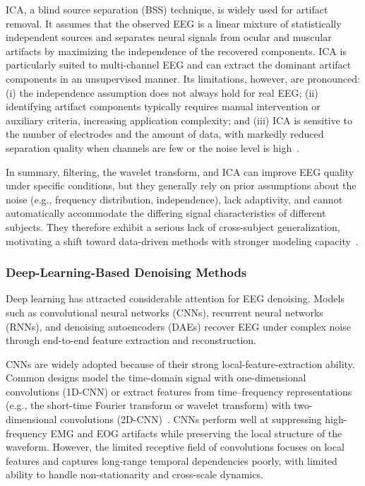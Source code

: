 ICA, a blind source separation (BSS) technique, is widely used for artifact
removal. It assumes that the observed EEG is a linear mixture of statistically
independent sources and separates neural signals from ocular and muscular
artifacts by maximizing the independence of the recovered components. ICA is
particularly suited to multi-channel EEG and can extract the dominant artifact
components in an unsupervised manner. Its limitations, however, are pronounced:
(i) the independence assumption does not always hold for real EEG; (ii)
identifying artifact components typically requires manual intervention or
auxiliary criteria, increasing application complexity; and (iii) ICA is
sensitive to the number of electrodes and the amount of data, with markedly
reduced separation quality when channels are few or the noise level is
high~\cite{jiao2018sparse}.

In summary, filtering, the wavelet transform, and ICA can improve EEG quality
under specific conditions, but they generally rely on prior assumptions about
the noise (e.g., frequency distribution, independence), lack adaptivity, and
cannot automatically accommodate the differing signal characteristics of
different subjects. They therefore exhibit a serious lack of cross-subject
generalization, motivating a shift toward data-driven methods with stronger
modeling capacity~\cite{chen2025uninftm,liu2025echo}.

\subsubsection{Deep-Learning-Based Denoising Methods}
Deep learning has attracted considerable attention for EEG denoising. Models
such as convolutional neural networks (CNNs), recurrent neural networks (RNNs),
and denoising autoencoders (DAEs) recover EEG under complex noise through
end-to-end feature extraction and reconstruction.

CNNs are widely adopted because of their strong local-feature-extraction
ability. Common designs model the time-domain signal with one-dimensional
convolutions (1D-CNN) or extract features from time--frequency representations
(e.g., the short-time Fourier transform or wavelet transform) with
two-dimensional convolutions
(2D-CNN)~\cite{zhang2021eegdenoisenet}. CNNs perform well at suppressing
high-frequency EMG and EOG artifacts while preserving the local structure of
the waveform. However, the limited receptive field of convolutions focuses on
local features and captures long-range temporal dependencies poorly, with
limited ability to handle non-stationarity and cross-scale dynamics.

